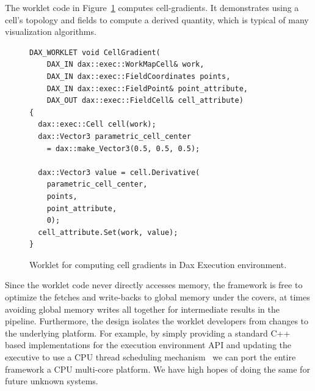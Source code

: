 \documentclass{vgtc}                          %
\newcommand*{\lcite}[1]{~\cite{#1}}
\begin{document}
The worklet code in Figure~\ref{fig:DaxCellGradientWorklet} computes
cell-gradients.  It demonstrates using a cell's topology and fields to
compute a derived quantity, which is typical of many visualization
algorithms.

\begin{figure}[htbp]
\centering
\begin{lstlisting}[language=Dax]
DAX_WORKLET void CellGradient(
    DAX_IN dax::exec::WorkMapCell& work,
    DAX_IN dax::exec::FieldCoordinates points,
    DAX_IN dax::exec::FieldPoint& point_attribute,
    DAX_OUT dax::exec::FieldCell& cell_attribute)
{
  dax::exec::Cell cell(work);
  dax::Vector3 parametric_cell_center
    = dax::make_Vector3(0.5, 0.5, 0.5);
 
  dax::Vector3 value = cell.Derivative(
    parametric_cell_center,
    points,
    point_attribute,
    0);
  cell_attribute.Set(work, value);
}
\end{lstlisting}
\caption{Worklet for computing cell gradients in Dax Execution environment.}
\label{fig:DaxCellGradientWorklet}
\end{figure}

Since the worklet code never directly accesses memory, the framework is free to
optimize the fetches and write-backs to global memory under the covers, at times avoiding
global memory writes all together for intermediate results in the pipeline.
Furthermore, the design isolates the worklet developers from changes to the
underlying platform. For example, by simply providing a standard C++ based
implementations for the execution environment API and updating the
executive to use a CPU thread scheduling
mechanism\lcite{pthreads,OpenMP,TBB} we can port the entire framework a CPU
multi-core platform.  We have high hopes of doing the same for future
unknown systems.
\end{document}
